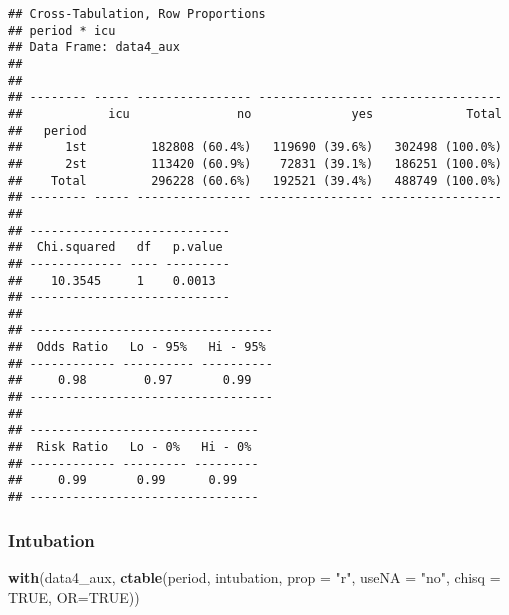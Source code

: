 \documentclass[
]{article}
\newenvironment{Shaded}{\begin{snugshade}}{\end{snugshade}}
\newcommand{\DataTypeTok}[1]{\textcolor[rgb]{0.13,0.29,0.53}{#1}}
\newcommand{\KeywordTok}[1]{\textcolor[rgb]{0.13,0.29,0.53}{\textbf{#1}}}
\newcommand{\NormalTok}[1]{#1}
\newcommand{\OtherTok}[1]{\textcolor[rgb]{0.56,0.35,0.01}{#1}}
\newcommand{\StringTok}[1]{\textcolor[rgb]{0.31,0.60,0.02}{#1}}
\begin{document}
\begin{verbatim}
## Cross-Tabulation, Row Proportions  
## period * icu  
## Data Frame: data4_aux  
## 
## 
## -------- ----- ---------------- ---------------- -----------------
##            icu               no              yes             Total
##   period                                                          
##      1st         182808 (60.4%)   119690 (39.6%)   302498 (100.0%)
##      2st         113420 (60.9%)    72831 (39.1%)   186251 (100.0%)
##    Total         296228 (60.6%)   192521 (39.4%)   488749 (100.0%)
## -------- ----- ---------------- ---------------- -----------------
## 
## ----------------------------
##  Chi.squared   df   p.value 
## ------------- ---- ---------
##    10.3545     1    0.0013  
## ----------------------------
## 
## ----------------------------------
##  Odds Ratio   Lo - 95%   Hi - 95% 
## ------------ ---------- ----------
##     0.98        0.97       0.99   
## ----------------------------------
## 
## --------------------------------
##  Risk Ratio   Lo - 0%   Hi - 0% 
## ------------ --------- ---------
##     0.99       0.99      0.99   
## --------------------------------
\end{verbatim}

\hypertarget{intubation-1}{%
\subsubsection{Intubation}\label{intubation-1}}

\begin{Shaded}
\begin{Highlighting}[]
\KeywordTok{with}\NormalTok{(data4_aux, }\KeywordTok{ctable}\NormalTok{(period, intubation, }\DataTypeTok{prop =} \StringTok{"r"}\NormalTok{, }\DataTypeTok{useNA =} \StringTok{"no"}\NormalTok{, }\DataTypeTok{chisq =} \OtherTok{TRUE}\NormalTok{, }\DataTypeTok{OR=}\OtherTok{TRUE}\NormalTok{))}
\end{Highlighting}
\end{Shaded}
\end{document}
